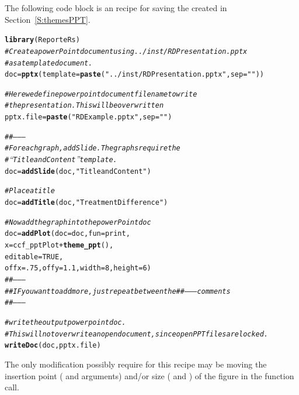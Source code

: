 \documentclass[nojss]{jss}\usepackage[]{graphicx}\usepackage[]{color}
\makeatletter
\newcommand{\hlnum}[1]{\textcolor[rgb]{0.686,0.059,0.569}{#1}}%
\newcommand{\hlstr}[1]{\textcolor[rgb]{0.192,0.494,0.8}{#1}}%
\newcommand{\hlcom}[1]{\textcolor[rgb]{0.678,0.584,0.686}{\textit{#1}}}%
\newcommand{\hlopt}[1]{\textcolor[rgb]{0,0,0}{#1}}%
\newcommand{\hlstd}[1]{\textcolor[rgb]{0.345,0.345,0.345}{#1}}%
\newcommand{\hlkwb}[1]{\textcolor[rgb]{0.69,0.353,0.396}{#1}}%
\newcommand{\hlkwc}[1]{\textcolor[rgb]{0.333,0.667,0.333}{#1}}%
\newcommand{\hlkwd}[1]{\textcolor[rgb]{0.737,0.353,0.396}{\textbf{#1}}}%
\newenvironment{kframe}{%
 \def\at@end@of@kframe{}%
 \ifinner\ifhmode%
  \def\at@end@of@kframe{\end{minipage}}%
  \begin{minipage}{\columnwidth}%
 \fi\fi%
 \def\FrameCommand##1{\hskip\@totalleftmargin \hskip-\fboxsep
 \colorbox{shadecolor}{##1}\hskip-\fboxsep
     \hskip-\linewidth \hskip-\@totalleftmargin \hskip\columnwidth}%
 \MakeFramed {\advance\hsize-\width
   \@totalleftmargin\z@ \linewidth\hsize
   \@setminipage}}%
 {\par\unskip\endMakeFramed%
 \at@end@of@kframe}
\newenvironment{knitrout}{}{} %
\makeatother
\begin{document}
The following code block is an  recipe for saving the  created in Section~\ref{S:themesPPT}. 
\begin{knitrout}\footnotesize
{}\color{fgcolor}\begin{kframe}
\begin{alltt}
\hlkwd{library}\hlstd{(ReporteRs)}
\hlcom{# Create a powerPoint document using ../inst/RDPresentation.pptx }
\hlcom{# as a template document.}
\hlstd{doc} \hlkwb{=} \hlkwd{pptx}\hlstd{(}\hlkwc{template}\hlstd{=}\hlkwd{paste}\hlstd{(}\hlstr{"../inst/RDPresentation.pptx"}\hlstd{,} \hlkwc{sep}\hlstd{=}\hlstr{""}\hlstd{))}

\hlcom{# Here we define powerpoint document filename to write}
\hlcom{# the presentation. This will be overwritten}
\hlstd{pptx.file} \hlkwb{=} \hlkwd{paste}\hlstd{(}\hlstr{"RDExample.pptx"}\hlstd{,} \hlkwc{sep}\hlstd{=}\hlstr{""}\hlstd{)}

\hlcom{##--------}
\hlcom{# For each graph, addSlide. The graphs require the }
\hlcom{# “Title and Content” template.}
\hlstd{doc} \hlkwb{=} \hlkwd{addSlide}\hlstd{( doc,} \hlstr{"Title and Content"} \hlstd{)}

\hlcom{# Place a title}
\hlstd{doc} \hlkwb{=} \hlkwd{addTitle}\hlstd{( doc,} \hlstr{"Treatment Difference"} \hlstd{)}

\hlcom{# Now add the graph into the powerPoint doc }
\hlstd{doc} \hlkwb{=} \hlkwd{addPlot}\hlstd{(} \hlkwc{doc}\hlstd{=doc,} \hlkwc{fun}\hlstd{=print,}
               \hlkwc{x}\hlstd{=ccf_pptPlot}\hlopt{+}\hlkwd{theme_ppt}\hlstd{() ,}
               \hlkwc{editable} \hlstd{=} \hlnum{TRUE}\hlstd{,}
               \hlkwc{offx}\hlstd{=}\hlnum{.75}\hlstd{,} \hlkwc{offy}\hlstd{=}\hlnum{1.1}\hlstd{,} \hlkwc{width}\hlstd{=}\hlnum{8}\hlstd{,} \hlkwc{height}\hlstd{=}\hlnum{6}\hlstd{)}
\hlcom{##--------}
\hlcom{## IF you want to add more, just repeat between the ##-------- comments}
\hlcom{##--------}

\hlcom{# write the output powerpoint doc. }
\hlcom{# This will not overwrite an open document, since open PPT files are locked.}
\hlkwd{writeDoc}\hlstd{( doc, pptx.file )}
\end{alltt}
\end{kframe}
\end{knitrout}

The only modification possibly require for this recipe may be moving the insertion point ( and  arguments) and/or size ( and ) of the figure in the  function call.
\end{document}
